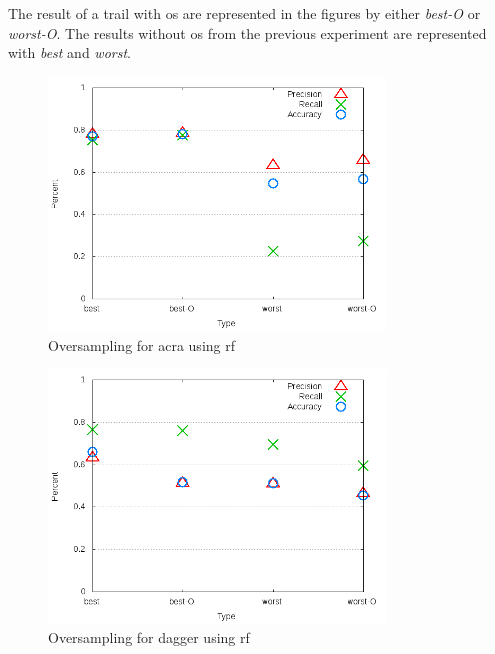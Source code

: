 The result of a trail with \gls{os} are represented in the figures by either \textit{best-O} or \textit{worst-O}. The results without \gls{os} from the previous experiment are represented with \textit{best} and \textit{worst}.

\begin{figure}[!t]
    \centering

        \includegraphics[width=0.8\textwidth]{images/rf/test_4/acra_sample_range}
        \caption{Oversampling for acra using \gls{rf}}
        \label{fig:test_4_acra_rf}
\end{figure}

\begin{figure}[!ht]
    \centering
        \includegraphics[width=0.8\textwidth]{images/rf/test_4/dagger_sample_range}
        \caption{Oversampling for dagger using \gls{rf}}
        \label{fig:test_4_dagger_rf}
\end{figure}

